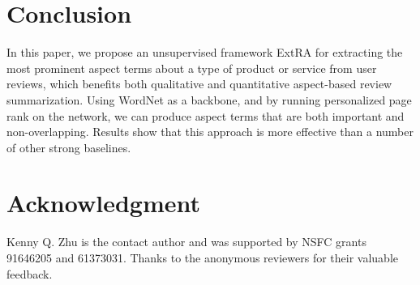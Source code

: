\documentclass[11pt,a4paper]{article}
\begin{document}
\section{Conclusion}

In this paper, we propose an unsupervised framework ExtRA for 
extracting the most prominent aspect terms about a type of product 
or service from user reviews, which benefits both qualitative and 
quantitative aspect-based review summarization.
Using WordNet as a backbone, and by running personalized page rank
on the network, we can produce aspect terms that are both important
and non-overlapping. Results show that this approach is more
effective than a number of other strong baselines.


\section*{Acknowledgment}
Kenny Q. Zhu is the contact author and was supported by NSFC grants
91646205 and 61373031. Thanks to the anonymous reviewers for their valuable
feedback.


\end{document}

